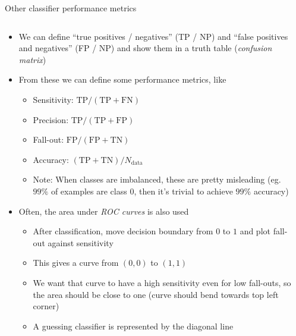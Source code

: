     \begin{frame}{Other classifier performance metrics}
      \enlargethispage{1cm}
      \begin{columns}
        \begin{column}{0.65\textwidth}
          \begin{itemize}
            \item We can define \enquote{true positives / negatives} (TP / NP) and \enquote{false positives and negatives} (FP / NP) and show them in a truth table (\emph{confusion matrix})
            \item From these we can define some performance metrics, like
            \begin{itemize}
              \item Sensitivity: $\text{TP} / (\text{TP} + \text{FN})$
              \item Precision: $\text{TP} / (\text{TP} + \text{FP})$
              \item Fall-out: $\text{FP} / (\text{FP} + \text{TN})$
              \item Accuracy: $(\text{TP} + \text{TN}) / N_\text{data}$
              \item Note: When classes are imbalanced, these are pretty misleading (eg. $99\%$ of examples are class 0, then it's trivial to achieve $99\%$ accuracy)
            \end{itemize}
            \item Often, the area under \emph{ROC curves} is also used
            \begin{itemize}
              \item After classification, move decision boundary from $0$ to $1$ and plot fall-out against sensitivity
              \item This gives a curve from $(0,0)$ to $(1, 1)$
              \item We want that curve to have a high sensitivity even for low fall-outs, so the area should be close to one (curve should bend towards top left corner)
              \item A guessing classifier is represented by the diagonal line
            \end{itemize}
          \end{itemize}
        \end{column}
        \begin{column}{0.35\textwidth}

\end{column}
\end{columns}
\end{frame}
